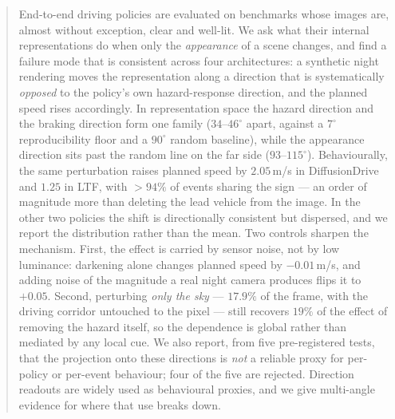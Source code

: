 \begin{abstract}
End-to-end driving policies are evaluated on benchmarks whose images are, almost without
exception, clear and well-lit. We ask what their internal representations do when only the
\emph{appearance} of a scene changes, and find a failure mode that is consistent across four
architectures: a synthetic night rendering moves the representation along a direction that is
systematically \emph{opposed} to the policy's own hazard-response direction, and the planned
speed rises accordingly. In representation space the hazard direction and the braking
direction form one family ($34$--$46^\circ$ apart, against a $7^\circ$ reproducibility floor
and a $90^\circ$ random baseline), while the appearance direction sits past the random line on
the far side ($93$--$115^\circ$). Behaviourally, the same perturbation raises planned speed by
$2.05$\,m/s in DiffusionDrive and $1.25$ in LTF, with $>94\%$ of events sharing the sign ---
an order of magnitude more than deleting the lead vehicle from the image. In the other two
policies the shift is directionally consistent but dispersed, and we report the distribution
rather than the mean.
Two controls sharpen the mechanism. First, the effect is carried by sensor noise, not by low
luminance: darkening alone changes planned speed by $-0.01$\,m/s, and adding noise of the
magnitude a real night camera produces flips it to $+0.05$. Second, perturbing \emph{only the
sky} --- $17.9\%$ of the frame, with the driving corridor untouched to the pixel --- still
recovers $19\%$ of the effect of removing the hazard itself, so the dependence is global rather
than mediated by any local cue. We also report, from five pre-registered tests, that the
projection onto these directions is \emph{not} a reliable proxy for per-policy or per-event
behaviour; four of the five are rejected. Direction readouts are widely used as behavioural
proxies, and we give multi-angle evidence for where that use breaks down.
\end{abstract}
